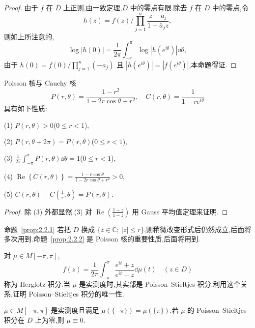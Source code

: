 \begin{proof}
由于 $f$ 在 $\overline{D}$ 上正则,由一致定理,$D$ 中的零点有限.除去 $f$ 在 $D$ 中的零点,令
\begin{equation*}
h(z) = f(z)\Bigg/\prod_{j = 1}^{n}\frac{z - a_{j}}{1 - \bar{a}_{j}z},
\end{equation*}
则如上所注意的,
\begin{equation*}
\log|h(0)| = \frac{1}{2\pi}\int_{-\pi}^{\pi}\log|h(e^{i\theta})|\dd\theta,
\end{equation*}
由于 $h(0) = f(0)/\prod_{j=1}^{n}(-a_{j})$ 且 $|h(e^{i\theta})| = |f(e^{i\theta})|$,本命题得证.
\end{proof}

\begin{proposition}\label{prop:2.2.2}
Poisson 核与 Cauchy 核
\begin{equation*}
P(r, \theta) = \frac{1 - r^{2}}{1 - 2r\cos\theta + r^{2}}, \quad C(r, \theta) = \frac{1}{1 - re^{i\theta}}
\end{equation*}
具有如下性质:

(1) $P(r, \theta) > 0$($0 \leq r < 1$),

(2) $P(r, \theta + 2\pi) = P(r, \theta)$($0 \leq r < 1$),

(3) $\frac{1}{2\pi}\int_{-\pi}^{\pi}P(r, \theta)\dd\theta = 1$($0 \leq r < 1$),

(4) $\operatorname{Re}\left\{C(r, \theta)\right\} = \frac{1 - r\cos\theta}{1 - 2r\cos\theta + r^{2}} > 0$,

(5) $C(r, \theta) - C\left(\frac{1}{r}, \theta\right) = P(r, \theta)$.
\end{proposition}

\begin{proof}
除 (3) 外都显然.(3) 对 $\operatorname{Re}\left(\frac{1 + z}{1 - z}\right)$ 用 Gauss 平均值定理来证明.
\end{proof}

命题~\ref{prop:2.2.1} 若把 $\overline{D}$ 换成 $\{z \in \mathbb{C};\ |z| \leq r\}$,则稍微改变形式后仍然成立,后面将多次用到.命题~\ref{prop:2.2.2} 是 Poisson 核的重要性质,后面将用到.

对 $\mu \in M[-\pi, \pi]$,
\begin{equation*}
f(z) = \frac{1}{2\pi}\int_{-\pi}^{\pi}\frac{e^{it} + z}{e^{it} - z}\dd\mu(t) \quad (z \in D)
\end{equation*}
称为 Herglotz 积分.当 $\mu$ 是实测度时,其实部是 Poisson--Stieltjes 积分.利用这个关系,证明 Poisson--Stieltjes 积分的唯一性.

\begin{proposition}\label{prop:2.2.3}
$\mu \in M[-\pi, \pi]$ 是实测度且满足 $\mu(\{-\pi\}) = \mu(\{\pi\})$.若 $\mu$ 的 Poisson--Stieltjes 积分在 $D$ 上为零,则 $\mu \equiv 0$.
\end{proposition}

